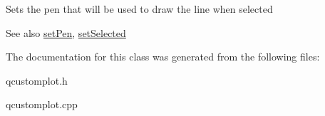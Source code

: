 Sets the pen that will be used to draw the line when selected

\begin{DoxySeeAlso}{See also}
\hyperlink{classQCPItemStraightLine_a9f36c9c9e60d7d9ac084c80380ac8601}{set\+Pen}, \hyperlink{classQCPAbstractItem_a203de94ad586cc44d16c9565f49d3378}{set\+Selected} 
\end{DoxySeeAlso}


The documentation for this class was generated from the following files\+:\begin{DoxyCompactItemize}
\item 
qcustomplot.\+h\item 
qcustomplot.\+cpp\end{DoxyCompactItemize}
